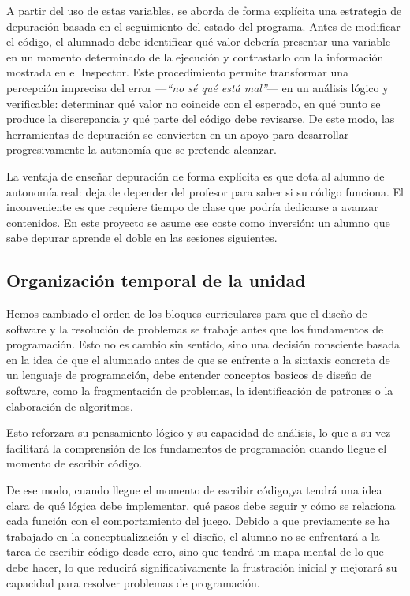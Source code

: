 \documentclass[a4paper,12pt]{article}
\begin{document}
A partir del uso de estas variables, se aborda de forma explícita una estrategia de 
depuración basada en el seguimiento del estado del programa. Antes de modificar
el código, el alumnado debe identificar qué valor debería presentar una variable en un momento
determinado de la ejecución y contrastarlo con la información mostrada en el Inspector. Este
procedimiento permite transformar una percepción imprecisa del error ---\textit{``no sé qué está mal''}---
en un análisis lógico y verificable: determinar qué valor no coincide con el esperado, en
qué punto se produce la discrepancia y qué parte del código debe revisarse. De este modo, las herramientas
de depuración se convierten en un apoyo para desarrollar progresivamente la autonomía que se pretende alcanzar.

La ventaja de enseñar depuración de forma explícita es que dota al alumno de
autonomía real: deja de depender del profesor para saber si su código funciona.
El inconveniente es que requiere tiempo de clase que podría dedicarse a avanzar
contenidos. En este proyecto se asume ese coste como inversión: un alumno que
sabe depurar aprende el doble en las sesiones siguientes.

\subsection{Organización temporal de la unidad}

Hemos cambiado el orden de los bloques curriculares para que el diseño de software
y la resolución de problemas se trabaje antes que los fundamentos de programación.
Esto no es cambio sin sentido, sino una decisión consciente basada en la idea de que el alumnado
antes de que se enfrente a la sintaxis concreta de un lenguaje de programación, debe entender
conceptos basicos de diseño de software, como la fragmentación de problemas, la identificación
de patrones o la elaboración de algoritmos.

Esto reforzara su pensamiento lógico y su capacidad de análisis, lo que a su vez facilitará la
comprensión de los fundamentos de programación cuando llegue el momento de escribir código.

De ese modo, cuando llegue el momento de escribir código,ya tendrá una idea clara de qué lógica
debe implementar, qué pasos debe seguir y cómo se relaciona cada función con el comportamiento del
juego. Debido a que previamente se ha trabajado en la conceptualización y el diseño, el alumno no se
enfrentará a la tarea de escribir código desde cero, sino que tendrá un mapa mental de lo que debe hacer,
lo que reducirá significativamente la frustración inicial y mejorará su capacidad para resolver problemas de programación.
\end{document}
